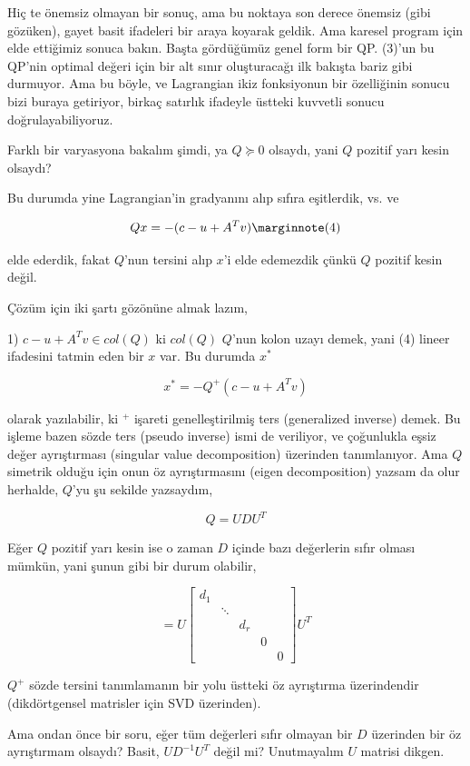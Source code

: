 \documentclass[12pt,fleqn]{article}\usepackage{../../common}
\begin{document}
Hiç te önemsiz olmayan bir sonuç, ama bu noktaya son derece önemsiz (gibi
gözüken), gayet basit ifadeleri bir araya koyarak geldik. Ama karesel
program için elde ettiğimiz sonuca bakın. Başta gördüğümüz genel form bir
QP. (3)'un bu QP'nin optimal değeri için bir alt sınır oluşturacağı ilk
bakışta bariz gibi durmuyor. Ama bu böyle, ve Lagrangian ikiz fonksiyonun
bir özelliğinin sonucu bizi buraya getiriyor, birkaç satırlık ifadeyle
üstteki kuvvetli sonucu doğrulayabiliyoruz.

Farklı bir varyasyona bakalım şimdi, ya $Q \succeq 0$ olsaydı, yani $Q$
pozitif yarı kesin olsaydı?

Bu durumda yine Lagrangian'in gradyanını alıp sıfıra eşitlerdik, vs. ve 

$$
Qx = -(c-u+A^Tv) 
\mlabel{4}
$$

elde ederdik, fakat $Q$'nun tersini alıp $x$'i elde edemezdik çünkü $Q$
pozitif kesin değil. 

Çözüm için iki şartı gözönüne almak lazım,

1) $c-u+A^T v \in col(Q)$ ki $col(Q)$ $Q$'nun kolon uzayı demek, yani (4)
lineer ifadesini tatmin eden bir $x$ var. Bu durumda $x^*$

$$
x^* = -Q^{+}(c-u+A^Tv)
$$

olarak yazılabilir, ki $^+$ işareti genelleştirilmiş ters (generalized
inverse) demek. Bu işleme bazen sözde ters (pseudo inverse) ismi de
veriliyor, ve çoğunlukla eşsiz değer ayrıştırması (singular value
decomposition) üzerinden tanımlanıyor. Ama $Q$ simetrik olduğu için onun öz
ayrıştırmasını (eigen decomposition) yazsam da olur herhalde, $Q$'yu şu
sekilde yazsaydım,

$$
Q = U D U^T
$$

Eğer $Q$ pozitif yarı kesin ise o zaman $D$ içinde bazı değerlerin sıfır
olması mümkün, yani şunun gibi bir durum olabilir, 

$$
= U \left[\begin{array}{ccccc}
d_1 & & & & \\
& \ddots & & & \\
& & d_r & & \\
& &  & 0 & \\
& &  &  & 0 
\end{array}\right]
U^T
$$

$Q^+$ sözde tersini tanımlamanın bir yolu üstteki öz ayrıştırma
üzerindendir (dikdörtgensel matrisler için SVD üzerinden). 

Ama ondan önce bir soru, eğer tüm değerleri sıfır olmayan bir $D$ üzerinden
bir öz ayrıştırmam olsaydı? Basit, $U D^{-1} U^T$ değil mi? Unutmayalım $U$
matrisi dikgen.
\end{document}
